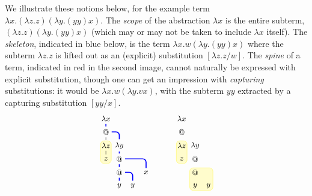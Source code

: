 \documentclass[a4paper,UKenglish,cleveref, autoref]{lipics-v2019}
\begin{document}
We illustrate these notions below, for the example term $\lambda x.(\lambda z.z)(\lambda y.(yy)x)$. The \emph{scope} of the abstraction $\lambda x$ is the entire subterm, $(\lambda z.z)(\lambda y.(yy)x)$ (which may or may not be taken to include $\lambda x$ itself). The \emph{skeleton}, indicated in blue below, is the term $\lambda x.w(\lambda y.(yy)x)$ where the subterm $\lambda z.z$ is lifted out as an (explicit) substitution $[\lambda z.z/w]$. The \emph{spine} of a term, indicated in red in the second image, cannot naturally be expressed with explicit substitution, though one can get an impression with \emph{capturing} substitutions: it would be $\lambda x.w(\lambda y.vx)$, with the subterm $yy$ extracted by a capturing substitution $[yy/x]$.
%
\[
	{\small   \begin{tikzpicture}[auto, scale = 0.75]
		\filldraw[fill = yellow!20, draw = yellow!70, rounded corners] (-0.3, -1.25) rectangle (0.3, -2.5);
		\node (a) at (0, 0) {$\lambda x$};
		\node (b) at (0, -0.75) {$@$};
		\node (c) at (0, -1.5) {$\lambda z$};
		\node (d) at (0, -2.25) {$z$};
		\node (e) at (0.75, -1.5) {$\lambda y$};
		\node (f) at (0.75, -2.25) {$@$};
		\node (g) at (0.75, -3) {$@$};
		\node (h) at (0.75, -3.75) {$y$};
		\node (i) at (1.5, -3.75) {$y$};
		\node (j) at (2.25, -3) {$x$};
		\draw [very thick, blue] (a) to (b);
		\draw (b) to (c);
		\draw (c) to (d);
		\draw [rounded corners, blue, very thick] (b) -| (e);
		\draw [blue, very thick] (e) to (f);
		\draw [very thick, blue] (f) to (g);
		\draw [blue, very thick, rounded corners] (f) -| (j);
		\draw [blue, very thick] (g) to (h); \draw [rounded corners, blue, very thick] (g) -| (i);
	\end{tikzpicture}}
\hspace{1cm}
	{\small  \begin{tikzpicture}[auto, scale = 0.75]
		\filldraw[fill = yellow!20, draw = yellow!70, rounded corners] (-0.3, -1.25) rectangle (0.3, -2.5);
		\filldraw[fill = yellow!20, draw = yellow!70, rounded corners] (0.45, -2.75) rectangle (1.75, -4);
		\node (a) at (0, 0) {$\lambda x$};
		\node (b) at (0, -0.75) {$@$};
		\node (c) at (0, -1.5) {$\lambda z$};
		\node (d) at (0, -2.25) {$z$};
		\node (e) at (0.75, -1.5) {$\lambda y$};
		\node (f) at (0.75, -2.25) {$@$};
		\node (g) at (0.75, -3) {$@$};
		\node (h) at (0.75, -3.75) {$y$};
		\node (i) at (1.5, -3.75) {$y$};

\end{tikzpicture}}\]
\end{document}
